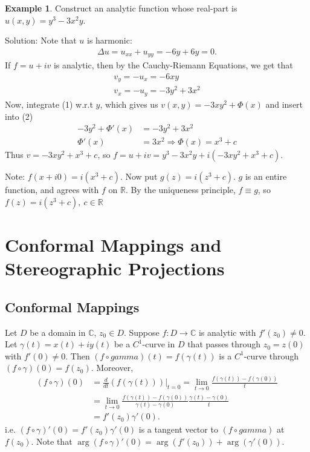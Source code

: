 \documentclass[12pt, a4paper]{article}
\theoremstyle{plain}
\theoremstyle{definition}
\newtheorem{example}{Example} %
\begin{document}
			\begin{example}
				Construct an analytic function whose real-part is $u(x,y) = y^3-3x^2y$.

				Solution: Note that $u$ is harmonic:
				\begin{align*}
					\Delta u = u_{xx} + u_{yy} = -6y + 6y = 0.
				\end{align*}
				If $f=u+iv$ is analytic, then by the Cauchy-Riemann Equations, we get that
				\begin{align*}
					v_y = -u_x = -6xy\tag*{(1)}\\
					v_x = -u_y = -3y^2+3x^2\tag*{(2)}
				\end{align*}
				Now, integrate (1) w.r.t $y$, which gives us $v(x,y) = -3xy^2+\Phi(x)$ and insert into (2)
				\begin{align*}
					-3y^2+\Phi'(x) &= -3y^2+3x^2\\
					\Phi'(x) &= 3x^2 \Rightarrow \Phi(x) = x^3+c
				\end{align*}
				Thus $v = -3xy^2 + x^3 + c$, so $f = u+iv = y^3-3x^2y + i(-3xy^2+x^3+c)$.

				Note: $f(x+i0) = i(x^3+c)$. Now put $g(z) = i(z^3+c)$. $g$ is an entire function, and agrees with $f$ on $\mathbb{R}$. By the uniqueness principle, $f\equiv g$, so $f(z) = i(z^3+c),\:c\in \mathbb{R}$
			\end{example}
	\section{Conformal Mappings and Stereographic Projections} %
	\label{sec:conformal_mappings_and_stereographic_projections}
		\subsection{Conformal Mappings} %
		\label{sub:conformal_mappings}
			Let $D$ be a domain in $\mathbb{C}$, $z_0\in D$. Suppose $f:D\to \mathbb{C}$ is analytic with $f'(z_0)\not=0$. Let $\gamma(t) = x(t) + iy(t)$ be a $C^1$-curve in $D$ that passes through $z_0 = z(0)$ with $f'(0)\not=0$. Then $(f\circ gamma)(t) = f(\gamma(t))$ is a $C^1$-curve through $(f\circ \gamma)(0) = f(z_0)$. Moreover,
			\begin{align*}
				(f\circ \gamma)(0) &= 
				\frac{d}{dt}(f(\gamma(t)))|_{t=0} = 
				\lim\limits_{t\to 0}\frac{f(\gamma(t))-f(\gamma(0))}{t} \\ &=
				\lim\limits_{t\to 0}\frac{f(\gamma(t))-f(\gamma(0))}{\gamma(t)-\gamma(0)}\frac{\gamma(t)-\gamma(0)}{t}\\ &=
				f'(z_0)\gamma'(0).
			\end{align*}
			i.e. $(f\circ \gamma)'(0) = f'(z_0)\gamma'(0)$ is a tangent vector to $(f\circ gamma)$ at $f(z_0)$. Note that $\arg(f\circ \gamma)'(0) = \arg(f'(z_0))+\arg(\gamma'(0))$.\\
\end{document}

